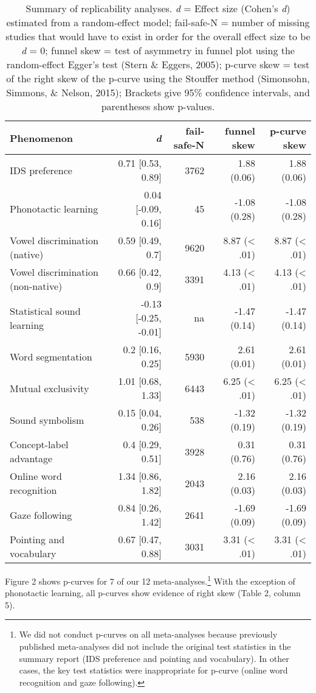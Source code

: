 \documentclass[english,floatsintext,man]{apa6}
\begin{document}
\begin{table}[t]
\footnotesize
\begin{tabular}{lrrrr}
\toprule
\textbf{Phenomenon} & \textbf{\textit{d}} & \textbf{fail-safe-N} & \textbf{funnel skew} & \textbf{p-curve skew}\\
\midrule

IDS preference & 0.71 [0.53, 0.89] & 3762 & 1.88 (0.06) & 1.88 (0.06)\\
Phonotactic learning & 0.04 [-0.09, 0.16] & 45 & -1.08 (0.28) & -1.08 (0.28)\\
Vowel discrimination (native) & 0.59 [0.49, 0.7] & 9620 & 8.87 (< .01) & 8.87 (< .01)\\
Vowel discrimination (non-native) & 0.66 [0.42, 0.9] & 3391 & 4.13 (< .01) & 4.13 (< .01)\\
Statistical sound learning & -0.13 [-0.25, -0.01] & na & -1.47 (0.14) & -1.47 (0.14)\\
Word segmentation & 0.2 [0.16, 0.25] & 5930 & 2.61 (0.01) & 2.61 (0.01)\\
Mutual exclusivity & 1.01 [0.68, 1.33] & 6443 & 6.25 (< .01) & 6.25 (< .01)\\
Sound symbolism & 0.15 [0.04, 0.26] & 538 & -1.32 (0.19) & -1.32 (0.19)\\
Concept-label advantage & 0.4 [0.29, 0.51] & 3928 & 0.31 (0.76) & 0.31 (0.76)\\
Online word recognition & 1.34 [0.86, 1.82] & 2043 & 2.16 (0.03) & 2.16 (0.03)\\
Gaze following & 0.84 [0.26, 1.42] & 2641 & -1.69 (0.09) & -1.69 (0.09)\\
Pointing and vocabulary & 0.67 [0.47, 0.88] & 3031 & 3.31 (< .01) & 3.31 (< .01)\\


\bottomrule
\end{tabular}
\caption{Summary of replicability analyses. \textit{d} = Effect size (Cohen's {\it d}) estimated from a random-effect model; fail-safe-N = number of missing studies that would have to exist in order for the overall effect size to be {\it d} = 0; funnel skew = test of asymmetry in funnel plot using the random-effect Egger's test (Stern \& Eggers, 2005); p-curve skew = test of the right skew of the p-curve using the Stouffer method (Simonsohn, Simmons, \& Nelson, 2015); Brackets give 95\% confidence intervals, and parentheses show p-values.}
\end{table}

Figure 2 shows p-curves for 7 of our 12
meta-analyses.\footnote{We did not conduct p-curves on all meta-analyses because previously published meta-analyses did not include the original test statistics in the summary report (IDS preference and pointing and vocabulary). In other cases, the key test statistics were inappropriate for p-curve (online word recognition and gaze following).}
With the exception of phonotactic learning, all p-curves show evidence
of right skew (Table 2, column 5).
\end{document}
